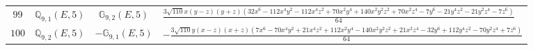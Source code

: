 \documentclass[fleqn,8pt,landscape]{jsarticle}
\begin{document}
\begin{table}[ht!]
\begin{center}
\begin{tabular}{cccl}
$ 99 $ & $ \mathbb{Q}_{9,1}(E,5) $ & $ \mathbb{G}_{9,2}(E,5) $ & $ \frac{3 \sqrt{110} x \left(y - z\right) \left(y + z\right) \left(32 x^{6} - 112 x^{4} y^{2} - 112 x^{4} z^{2} + 70 x^{2} y^{4} + 140 x^{2} y^{2} z^{2} + 70 x^{2} z^{4} - 7 y^{6} - 21 y^{4} z^{2} - 21 y^{2} z^{4} - 7 z^{6}\right)}{64} $ \\
$ 100 $ & $ \mathbb{Q}_{9,2}(E,5) $ & $ -\mathbb{G}_{9,1}(E,5) $ & $ - \frac{3 \sqrt{110} y \left(x - z\right) \left(x + z\right) \left(7 x^{6} - 70 x^{4} y^{2} + 21 x^{4} z^{2} + 112 x^{2} y^{4} - 140 x^{2} y^{2} z^{2} + 21 x^{2} z^{4} - 32 y^{6} + 112 y^{4} z^{2} - 70 y^{2} z^{4} + 7 z^{6}\right)}{64} $ \\
 \hline \hline
\end{tabular}
\end{center}
\end{table}
\end{document}
